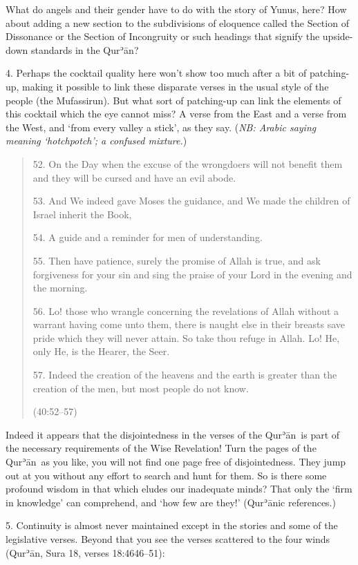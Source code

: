 \documentclass[12pt]{memoir}
\def\´{ʾ} %
\def \Quran{Qur\-\´ān} %
\newcommand{\QRef}[1]{{\color{darkblue}#1}}
\newcommand{\NB}[1]{\emph{\small NB: #1}}
\begin{document}
What do angels and their gender have to do with the story of Yunus, here?
How about adding a new section to the subdivisions of eloquence
called the Section of Dissonance or the Section of Incongruity
or such headings that signify the upside-down standards in the \Quran?

4. Perhaps the cocktail quality here won’t show too much
after a bit of patching-up,
making it possible to link these disparate verses
in the usual style of the people (the Mufassirun).
But what sort of patching-up can link the elements of this cocktail
which the eye cannot miss?
A verse from the East and a verse from the West,
and ‘from every valley a stick’, as they say.
(\NB{Arabic saying meaning ‘hotchpotch’; a confused mixture.})

\begin{quote}
52. On the Day when the excuse of the wrongdoers will not benefit them
and they will be cursed and have an evil abode.

53. And We indeed gave Moses the guidance,
and We made the children of Israel inherit the Book,

54. A guide and a reminder for men of understanding.

55. Then have patience, surely the promise of Allah is true,
and ask forgiveness for your sin and sing the praise of your Lord
in the evening and the morning.

56. Lo! those who wrangle concerning the revelations of Allah
without a warrant having come unto them,
there is naught else in their breasts save pride which they will never attain.
So take thou refuge in Allah.
Lo! He, only He, is the Hearer, the Seer.

57. Indeed the creation of the heavens and the earth is greater
than the creation of the men, but most people do not know.

(\QRef{40:52–57})
\end{quote}

Indeed it appears that the disjointedness in the verses of the \Quran\
is part of the necessary requirements of the Wise Revelation!
Turn the pages of the \Quran\ as you like,
you will not find one page free of disjointedness.
They jump out at you without any effort to search and hunt for them.
So is there some profound wisdom in that which eludes our inadequate minds?
That only the ‘firm in knowledge’ can comprehend, and ‘how few are they!’
(\Quran{}ic references.)

5. Continuity is almost never maintained except in the stories
and some of the legislative verses.
Beyond that you see the verses scattered to the four winds
(\Quran, Sura \QRef{18}, verses \QRef{18:46}{46–51}):
\end{document}
